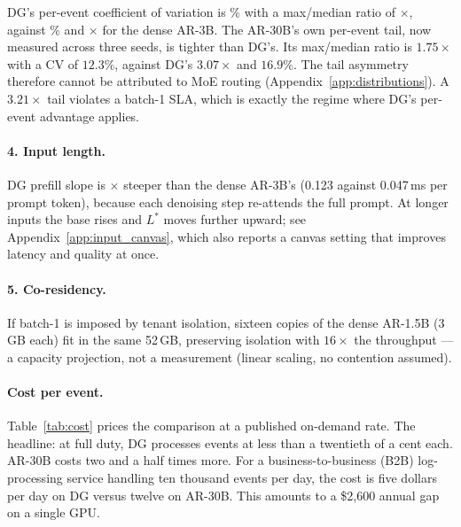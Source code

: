 DG's per-event coefficient of variation is \dgEventCV\%
with a max/median ratio of \dgMaxMed$\times$, against
\arEventCV\% and \arMaxMed$\times$ for the dense AR-3B. The AR-30B's
own per-event tail, now measured across three seeds, is tighter than
DG's. Its max/median ratio is $1.75\times$ with a CV of $12.3\%$,
against DG's $3.07\times$ and $16.9\%$. The tail asymmetry therefore
cannot be attributed to MoE routing (Appendix~\ref{app:distributions}).
A $3.21\times$ tail violates a batch-1 SLA, which is exactly the
regime where DG's per-event advantage applies.

\paragraph{4. Input length.}

DG prefill slope is $\times$ steeper than
the dense AR-3B's (0.123 against 0.047\,ms per prompt token), because
each denoising step re-attends the full prompt. At
longer inputs the base rises and $L^{*}$ moves further upward; see
Appendix~\ref{app:input_canvas}, which also reports a canvas setting
that improves latency and quality at once.

\paragraph{5. Co-residency.}

If batch-1 is imposed by tenant isolation, sixteen copies of the
dense AR-1.5B (3\,GB each) fit in the same 52\,GB, preserving
isolation with $16\times$ the throughput --- a capacity projection,
not a measurement (linear scaling, no contention assumed).

\paragraph{Cost per event.}

Table~\ref{tab:cost} prices the comparison at a published on-demand
rate. The headline: at full duty, DG processes events at less than a
twentieth of a cent each. AR-30B costs two and a half times more.
For a business-to-business (B2B) log-processing service handling ten
thousand events per day, the cost is five dollars per day on DG versus
twelve on AR-30B. This amounts to a \$2{,}600 annual gap on a single
GPU.

